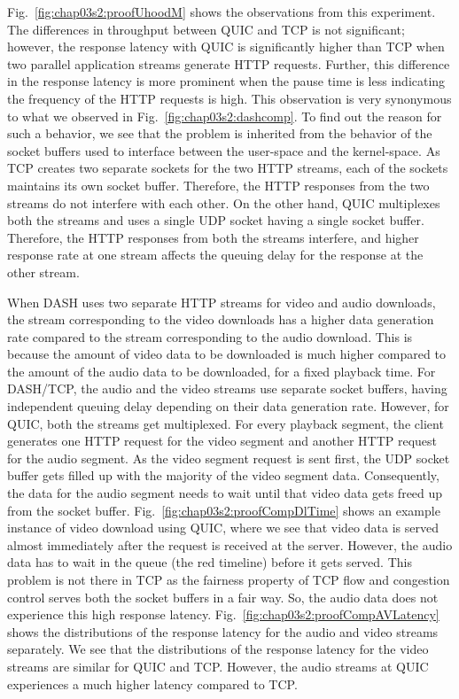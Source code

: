 Fig.~\ref{fig:chap03s2:proofUhoodM} shows the observations from this experiment. The differences in throughput between QUIC and TCP is not significant; however, the response latency with QUIC is significantly higher than TCP when two parallel application streams generate HTTP requests. Further, this difference in the response latency is more prominent when the pause time is less indicating the frequency of the HTTP requests is high. This observation is very synonymous to what we observed in Fig.~\ref{fig:chap03s2:dashcomp}. To find out the reason for such a behavior, we see that the problem is inherited from the behavior of the socket buffers used to interface between the user-space and the kernel-space. As TCP creates two separate sockets for the two HTTP streams, each of the sockets maintains its own socket buffer. Therefore, the HTTP responses from the two streams do not interfere with each other. On the other hand, QUIC multiplexes both the streams and uses a single UDP socket having a single socket buffer. Therefore, the HTTP responses from both the streams interfere, and higher response rate at one stream affects the queuing delay for the response at the other stream. 


When DASH uses two separate HTTP streams for video and audio downloads, the stream corresponding to the video downloads has a higher data generation rate compared to the stream corresponding to the audio download. This is because the amount of video data to be downloaded is much higher compared to the amount of the audio data to be downloaded, for a fixed playback time. For DASH/TCP, the audio and the video streams use separate socket buffers, having independent queuing delay depending on their data generation rate. However, for QUIC, both the streams get multiplexed. For every playback segment, the client generates one HTTP request for the video segment and another HTTP request for the audio segment. As the video segment request is sent first, the UDP socket buffer gets filled up with the majority of the video segment data. Consequently, the data for the audio segment needs to wait until that video data gets freed up from the socket buffer. Fig.~\ref{fig:chap03s2:proofCompDlTime} shows an example instance of video download using QUIC, where we see that video data is served almost immediately after the request is received at the server. However, the audio data has to wait in the queue (the red timeline) before it gets served. This problem is not there in TCP as the fairness property of TCP flow and congestion control serves both the socket buffers in a fair way. So, the audio data does not experience this high response latency. Fig.~\ref{fig:chap03s2:proofCompAVLatency} shows the distributions of the response latency for the audio and video streams separately. We see that the distributions of the response latency for the video streams are similar for QUIC and TCP. However, the audio streams at QUIC experiences a much higher latency compared to TCP. 


